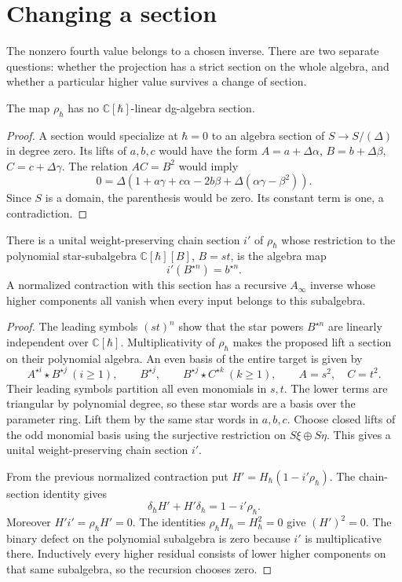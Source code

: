 \section{Changing a section}
\label{sec:vol2-relative-sections}

The nonzero fourth value belongs to a chosen inverse.
There are two separate questions: whether the projection has
a strict section on the whole algebra, and whether a
particular higher value survives a change of section.

\begin{proposition}\label{prop:vol2-relative-no-strict-section}
The map $\rho_\hbar$ has no $\mathbb C[\hbar]$-linear
dg-algebra section.
\end{proposition}

\begin{proof}
A section would specialize at $\hbar=0$ to an algebra
section of $S\to S/(\Delta)$ in degree zero.
Its lifts of $a,b,c$ would have the form
$A=a+\Delta\alpha$, $B=b+\Delta\beta$,
$C=c+\Delta\gamma$. The relation $AC=B^2$ would imply
\[
 0=\Delta\left(
  1+a\gamma+c\alpha-2b\beta
       +\Delta(\alpha\gamma-\beta^2)\right).
\]
Since $S$ is a domain, the parenthesis would be zero.
Its constant term is one, a contradiction.
\end{proof}

\begin{proposition}\label{prop:vol2-relative-polynomial-section}
There is a unital weight-preserving chain section $i'$ of
$\rho_\hbar$ whose restriction to the polynomial star-subalgebra
$\mathbb C[\hbar][B]$, $B=st$, is the algebra map
\[
 i'(B^{\star n})=b^{\star n}.
\]
A normalized contraction with this section has a recursive
$A_\infty$ inverse whose higher components all vanish when
every input belongs to this subalgebra.
\end{proposition}

\begin{proof}
The leading symbols $(st)^n$ show that the star powers
$B^{\star n}$ are linearly independent over $\mathbb C[\hbar]$.
Multiplicativity of $\rho_\hbar$ makes the proposed lift a
section on their polynomial algebra.
An even basis of the entire target is given by
\[
 A^{\star i}\star B^{\star j}\ (i\geq1),\qquad
 B^{\star j},\qquad
 B^{\star j}\star C^{\star k}\ (k\geq1),
 \qquad A=s^2,\quad C=t^2.
\]
Their leading symbols partition all even monomials in $s,t$.
The lower terms are triangular by polynomial degree, so
these star words are a basis over the parameter ring.
Lift them by the same star words in $a,b,c$.
Choose closed lifts of the odd monomial basis using the
surjective restriction on $S\xi\oplus S\eta$.
This gives a unital weight-preserving chain section $i'$.

From the previous normalized contraction put
$H'=H_\hbar(1-i'\rho_\hbar)$.
The chain-section identity gives
\[
 \delta_\hbar H'+H'\delta_\hbar=1-i'\rho_\hbar.
\]
Moreover $H'i'=\rho_\hbar H'=0$.
The identities $\rho_\hbar H_\hbar=H_\hbar^2=0$
give $(H')^2=0$.
The binary defect on the polynomial subalgebra is zero
because $i'$ is multiplicative there. Inductively every
higher residual consists of lower higher components on
that same subalgebra, so the recursion chooses zero.
\end{proof}

